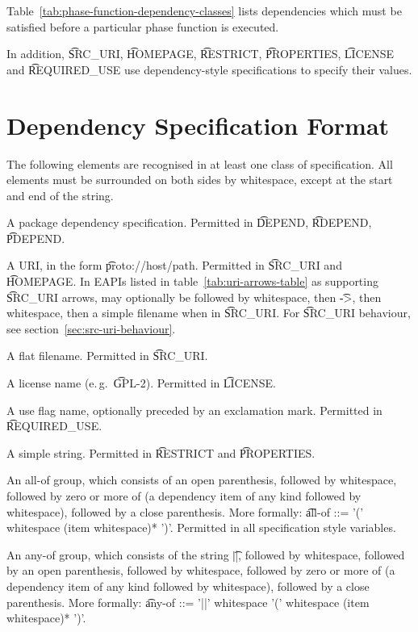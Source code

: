Table~\ref{tab:phase-function-dependency-classes} lists dependencies which must be satisfied before
a particular phase function is executed.

In addition, \t{SRC\_URI}, \t{HOMEPAGE}, \t{RESTRICT}, \t{PROPERTIES}, \t{LICENSE} and
\t{REQUIRED\_USE} use dependency-style specifications to specify their values.

\section{Dependency Specification Format}

The following elements are recognised in at least one class of specification. All elements must
be surrounded on both sides by whitespace, except at the start and end of the string.

\begin{compactitem}
\item A package dependency specification. Permitted in \t{DEPEND}, \t{RDEPEND}, \t{PDEPEND}.
\item A URI, in the form \t{proto://host/path}. Permitted in \t{SRC\_URI} and \t{HOMEPAGE}\@.
    In EAPIs listed in table~\ref{tab:uri-arrows-table} as supporting \t{SRC\_URI} arrows, may
    optionally be followed by whitespace, then \t{->}, then whitespace, then a simple filename when
    in \t{SRC\_URI}\@. For \t{SRC\_URI} behaviour, see section~\ref{sec:src-uri-behaviour}.
\item A flat filename. Permitted in \t{SRC\_URI}.
\item A license name (e.\,g.\ \t{GPL-2}). Permitted in \t{LICENSE}.
\item A use flag name, optionally preceded by an exclamation mark. Permitted in \t{REQUIRED\_USE}.
\item A simple string. Permitted in \t{RESTRICT} and \t{PROPERTIES}.
\item An all-of group, which consists of an open parenthesis, followed by whitespace,
    followed by zero or more of (a dependency item of any kind followed by whitespace), followed
    by a close parenthesis. More formally:
    \t{all-of ::= '(' whitespace (item whitespace)* ')'}. Permitted in all specification style
    variables.
\item An any-of group, which consists of the string \t{||}, followed by whitespace,
    followed by an open parenthesis, followed by whitespace, followed by zero or more
    of (a dependency item of any kind followed by whitespace), followed by a close parenthesis.
    More formally: \t{any-of ::= '||' whitespace '(' whitespace (item whitespace)* ')'}.

\end{compactitem}
